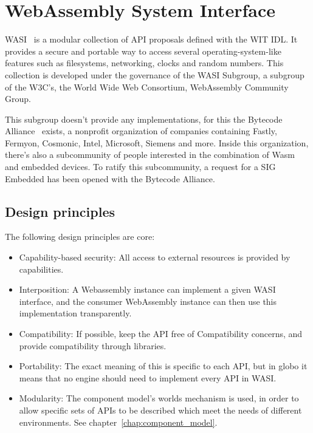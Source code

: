 \section{WebAssembly System Interface}
\label{sec:wasi}

\gls{WASI}~\cite{wasi} is a modular collection of \gls{API} proposals defined with the \gls{WIT} IDL. It provides a secure and portable way to access several operating-system-like features such as filesystems, networking, clocks and random numbers. This collection is developed under the governance of the \gls{WASI} Subgroup, a subgroup of the W3C's, the World Wide Web Consortium, WebAssembly Community Group.

This subgroup doesn't provide any implementations, for this the Bytecode Alliance~\cite{ba:announce} exists, a nonprofit organization of companies containing Fastly, Fermyon, Cosmonic, Intel, Microsoft, Siemens and more. Inside this organization, there's also a subcommunity of people interested in the combination of \gls{Wasm} and embedded devices. To ratify this subcommunity, a request for a \gls{SIG} Embedded has been opened with the Bytecode Alliance.

\subsection{Design principles}
\label{sec:design}

The following design principles are core:

\begin{itemize}
    \item Capability-based security: All access to external resources is provided by capabilities.
    \item Interposition: A Webassembly instance can implement a given WASI interface, and the consumer WebAssembly instance can then use this implementation transparently.
    \item Compatibility: If possible, keep the \gls{API} free of Compatibility concerns, and provide compatibility through libraries.
    \item Portability: The exact meaning of this is specific to each \gls{API}, but in globo it means that no engine should need to implement every \gls{API} in \gls{WASI}.
    \item Modularity: The component model's worlds mechanism is used, in order to allow specific sets of APIs to be described which meet the needs of different environments. See chapter~\ref{chap:component_model}.
\end{itemize}

